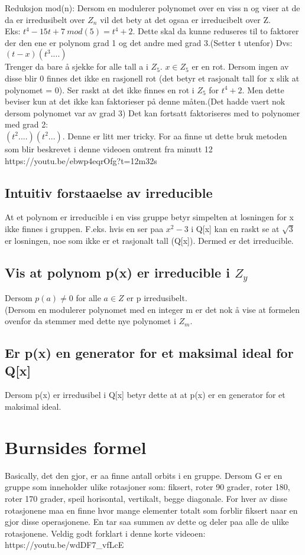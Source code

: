 \documentclass[12pt,a4paper]{article}
\begin{document}
Reduksjon mod(n): Dersom en modulerer polynomet over en viss n og viser at de da er irredusibelt over $Z_n$ vil det bety at det ogsaa er irreducibelt over Z.\\
Eks: $t^4 - 15t + 7\ mod(5) = t^4 + 2$. Dette skal da kunne reduseres til to faktorer der den ene er polynom grad 1 og det andre med grad 3.(Setter t utenfor) Dvs: $(t-x)(t^3 ....)$\\
Trenger da bare å sjekke for alle tall a i $Z_5$. $x\in Z_5$ er en rot. Dersom ingen av disse blir 0 finnes det ikke en rasjonell rot (det betyr et rasjonalt tall for x slik at polynomet = 0). Ser raskt at det ikke finnes en rot i $Z_5$ for $t^4 + 2$. Men dette beviser kun at det ikke kan faktorieser på denne måten.(Det hadde vaert nok dersom polynomet var av grad 3) Det kan fortsatt faktoriseres med to polynomer med grad 2: \\
$(t^2....)(t^2...)$. Denne er litt mer tricky. For aa finne ut dette bruk metoden som blir beskrevet i denne videoen omtrent fra minutt 12\\
https://youtu.be/ebwp4eqrOfg?t=12m32s

\subsection*{Intuitiv forstaaelse av irreducible}
At et polynom er irreducible i en viss gruppe betyr simpelten at losningen for x ikke finnes i gruppen. F.eks. hvis en ser paa $x^2 - 3$ i Q[x] kan en raskt se at $\sqrt{3}$ er losningen, noe som ikke er et rasjonalt tall (Q[x]). Dermed er det irreducible. 

\subsection*{Vis at polynom p(x) er irreducible i $Z_y$}
Dersom $p(a) \neq 0$ for alle $a \in Z$ er p irredusibelt. \\
(Dersom en modulerer polynomet med en integer m er det nok å vise at formelen ovenfor da stemmer med dette nye polynomet i $Z_m$.


\subsection*{Er p(x) en generator for et maksimal ideal for Q[x]}
Dersom p(x) er irredusibel i Q[x] betyr dette at at p(x) er en generator for et maksimal ideal. 


\section*{Burnsides formel}
Basically, det den gjor, er aa finne antall orbits i en gruppe.
Dersom G er en gruppe som inneholder ulike rotasjoner som: fiksert, roter 90 grader, roter 180, roter 170 grader, speil horisontal, vertikalt, begge diagonale. For hver av disse rotasjonene maa en finne hvor mange elementer totalt som forblir fiksert naar en gjor disse operasjonene. En tar saa summen av dette og deler paa alle de ulike rotasjonene. Veldig godt forklart i denne korte videoen:\\
https://youtu.be/wdDF7\_vfLcE
\end{document}
